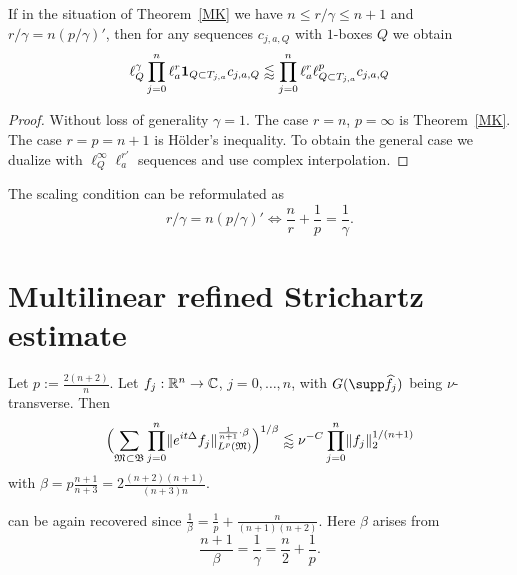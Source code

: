 \documentclass[biblatex]{pzorin-note}
\newcommand{\eit}{e^{i t \Delta}}
\newcommand{\bB}{\mathfrak{B}} %
\newcommand{\bM}{\mathfrak{M}} %
\begin{document}
\begin{corollary}\label{cor:mixed-norm-mult-Kakeya}
If in the situation of Theorem~\ref{MK} we have $n \leq r/\gamma \leq n+1$ and $r/\gamma = n(p/\gamma)'$, then for any sequences $c_{j,a,Q}$ with $1$-boxes $Q$ we obtain
\[
\ell^{\gamma}_{Q} \prod_{j=0}^{n} \ell^{r}_{a} \mathbf{1}_{Q \subset T_{j,a}} c_{j,a,Q}
\lessapprox
\prod_{j=0}^{n} \ell^{r}_{a} \ell^{p}_{Q \subset T_{j,a}} c_{j,a,Q}
\]
\end{corollary}
\begin{proof}
Without loss of generality $\gamma=1$.
The case $r=n$, $p=\infty$ is Theorem~\ref{MK}.
The case $r=p=n+1$ is H\"older's inequality.
To obtain the general case we dualize with $\ell^{\infty}_{Q}\ell^{r'}_{a}$ sequences and use complex interpolation.
\end{proof}
The scaling condition can be reformulated as
\begin{equation}
\label{eq:mixed-norm-mult-Kakeya:scaling}
r/\gamma = n(p/\gamma)'
\iff
\frac{n}{r} + \frac{1}{p} = \frac{1}{\gamma}.
\end{equation}

\section{Multilinear refined Strichartz estimate}\label{sec:kRS}

\begin{theorem}  \label{thm-kRS}
Let $p:=\frac{2(n+2)}{n}$.
Let $f_j: \mathbb{R}^n \rightarrow \mathbb{C}$, $j=0,\dotsc,n$, with $G(\supp \widehat{f_{j}})$ being $\nu$-transverse.
Then
\begin{equation} \label{kRS}
\Bigl( \sum_{\bM \subset \bB} \prod_{j=0}^{n} \norm{ \eit f_{j} }_{L^{p}(\bM)}^{\frac{1}{n+1} \cdot \beta} \Bigr)^{1/\beta}
\lessapprox \nu^{-C}
\prod_{j=0}^{n} \norm{f_{j}}_{2}^{1/(n+1)}
\end{equation}
with $\beta = p \frac{n+1}{n+3} = 2 \frac{(n+2)(n+1)}{(n+3)n}$.
\end{theorem}

\cite[Theorem 4.2]{MR3842310} can be again recovered since $\frac{1}{\beta} = \frac{1}{p} + \frac{n}{(n+1)(n+2)}$.
Here $\beta$ arises from
\[
\frac{n+1}{\beta} = \frac{1}{\gamma} = \frac{n}{2} + \frac{1}{p}.
\]
\end{document}
